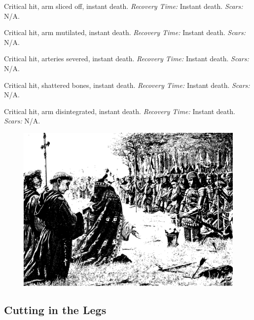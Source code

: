 \documentclass[12pt]{book}  %
\begin{document}
\begin{description}[labelwidth=1.5em, leftmargin=*, itemsep=0.4em]
    \item[16 -] Critical hit, arm sliced off, instant death. \textit{Recovery Time:} Instant death. \textit{Scars:} N/A.
    \item[17 -] Critical hit, arm mutilated, instant death. \textit{Recovery Time:} Instant death. \textit{Scars:} N/A.
    \item[18 -] Critical hit, arteries severed, instant death. \textit{Recovery Time:} Instant death. \textit{Scars:} N/A.
    \item[19 -] Critical hit, shattered bones, instant death. \textit{Recovery Time:} Instant death. \textit{Scars:} N/A.
    \item[20 -] Critical hit, arm disintegrated, instant death. \textit{Recovery Time:} Instant death. \textit{Scars:} N/A.
\end{description}

\begin{figure}[h]
    \centering
    \includegraphics[width=\textwidth]{./images/combat07.pdf}
\end{figure}

\subsection{Cutting in the Legs}
\end{document}

